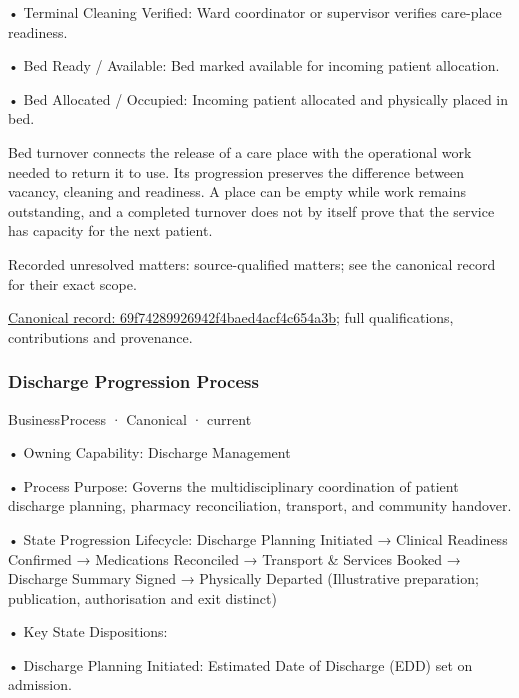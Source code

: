•
Terminal Cleaning Verified: Ward coordinator or supervisor verifies care-place readiness.



•
Bed Ready / Available: Bed marked available for incoming patient allocation.



•
Bed Allocated / Occupied: Incoming patient allocated and physically placed in bed.



Bed turnover connects the release of a care place with the operational work needed to return it to use. Its progression preserves the difference between vacancy, cleaning and readiness. A place can be empty while work remains outstanding, and a completed turnover does not by itself prove that the service has capacity for the next patient.


{\small Recorded unresolved matters: source-qualified matters; see the canonical record for their exact scope.}\par
{\footnotesize \href{../../../../continuum/business/business-process/69f74289926942f4baed4acf4c654a3b.md}{Canonical record: 69f74289926942f4baed4acf4c654a3b}; full qualifications, contributions and provenance.}\par
\subsubsection{Discharge Progression Process}

\label{element:7165955d9c454175a04b9ad00293f011}
{\small BusinessProcess · Canonical · current}\par

•
Owning Capability: Discharge Management



•
Process Purpose: Governs the multidisciplinary coordination of patient discharge planning, pharmacy reconciliation, transport, and community handover.



•
State Progression Lifecycle: Discharge Planning Initiated → Clinical Readiness Confirmed → Medications Reconciled → Transport \& Services Booked → Discharge Summary Signed → Physically Departed   (Illustrative preparation; publication, authorisation and exit distinct)



•
Key State Dispositions:



•
Discharge Planning Initiated: Estimated Date of Discharge (EDD) set on admission.



